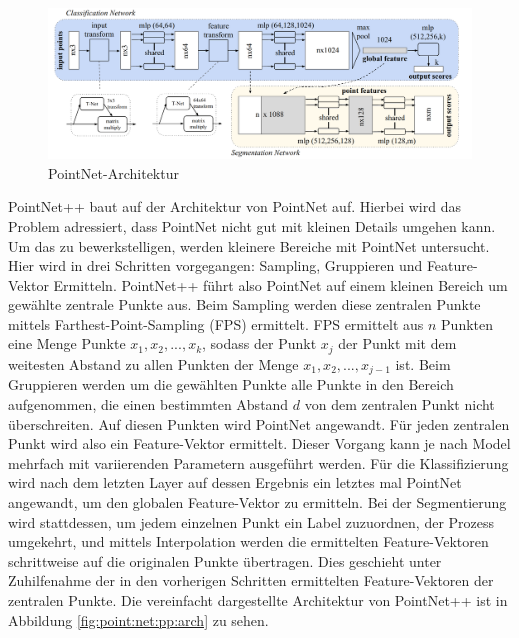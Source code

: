 \documentclass[12pt,titlepage, twoside]{article}
\begin{document}
\begin{figure}
    \centering
    \includegraphics[width=1.0\textwidth]{./Images/PointNetArchitektur.png}
    \caption{PointNet-Architektur \cite{qi2017pointnet}}
    \label{fig:point:net:arch}
\end{figure}

PointNet++ baut auf der Architektur von PointNet auf. Hierbei wird das Problem adressiert, dass PointNet nicht gut mit kleinen Details umgehen kann. 
Um das zu bewerkstelligen, werden kleinere Bereiche mit PointNet untersucht. Hier wird in drei Schritten vorgegangen: Sampling, Gruppieren und Feature-Vektor Ermitteln.
PointNet++ führt also PointNet auf einem kleinen Bereich um gewählte zentrale Punkte aus. Beim Sampling werden diese zentralen Punkte mittels Farthest-Point-Sampling (FPS) ermittelt. 
FPS ermittelt aus $n$ Punkten eine Menge Punkte ${x_1,x_2,...,x_k}$, sodass der Punkt $x_j$ der Punkt mit dem weitesten Abstand zu allen Punkten der Menge ${x_1,x_2,...,x_{j-1}}$ ist.
Beim Gruppieren werden um die gewählten Punkte alle Punkte in den Bereich aufgenommen, die einen bestimmten Abstand $d$ von dem zentralen Punkt nicht überschreiten. 
Auf diesen Punkten wird PointNet angewandt. Für jeden zentralen Punkt wird also ein Feature-Vektor ermittelt.
Dieser Vorgang kann je nach Model mehrfach mit variierenden Parametern ausgeführt werden. 
Für die Klassifizierung wird nach dem letzten Layer auf dessen Ergebnis ein letztes mal PointNet angewandt, um den globalen Feature-Vektor zu ermitteln.
Bei der Segmentierung wird stattdessen, um jedem einzelnen Punkt ein Label zuzuordnen, der Prozess umgekehrt, und mittels Interpolation werden die ermittelten Feature-Vektoren schrittweise auf die originalen Punkte 
übertragen. Dies geschieht unter Zuhilfenahme der in den vorherigen Schritten ermittelten Feature-Vektoren der zentralen Punkte.
Die vereinfacht dargestellte Architektur von PointNet++ ist in Abbildung \ref{fig:point:net:pp:arch} zu sehen.
\end{document}

